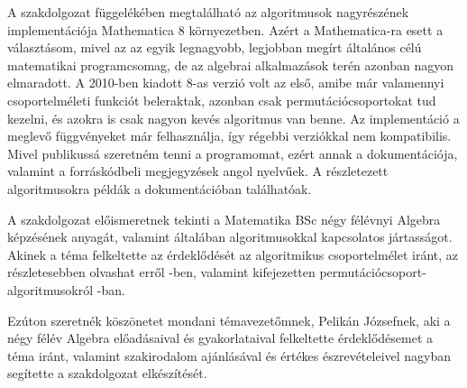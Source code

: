 A szakdolgozat függelékében megtalálható az algoritmusok nagyrészének implementációja Mathematica 8 környezetben.
Azért a Mathematica-ra esett a választásom, mivel az az egyik legnagyobb, legjobban megírt általános célú matematikai programcsomag, de az algebrai alkalmazások terén azonban nagyon elmaradott.
A 2010-ben kiadott 8-as verzió volt az első, amibe már valamennyi csoportelméleti funkciót beleraktak, azonban csak permutációcsoportokat tud kezelni, és azokra is csak nagyon kevés algoritmus van benne.
Az implementáció a meglevő függvényeket már felhasználja, így régebbi verziókkal nem kompatibilis.
Mivel publikussá szeretném tenni a programomat, ezért annak a dokumentációja, valamint a forráskódbeli megjegyzések angol nyelvűek.
A részletezett algoritmusokra példák a dokumentációban találhatóak.

A szakdolgozat előismeretnek tekinti a Matematika BSc négy félévnyi Algebra képzésének anyagát, valamint általában algoritmusokkal kapcsolatos jártasságot.
Akinek a téma felkeltette az érdeklődését az algoritmikus csoportelmélet iránt, az részletesebben olvashat erről \cite{HEO05}-ben,
valamint kifejezetten permutációcsoport-algoritmusokról \cite{Ser03}-ban.

Ezúton szeretnék köszönetet mondani témavezetőmnek, Pelikán Józsefnek, aki a négy félév Algebra előadásaival és gyakorlataival felkeltette érdeklődésemet a téma iránt,
valamint szakirodalom ajánlásával és értékes észrevételeivel nagyban segítette a szakdolgozat elkészítését.
